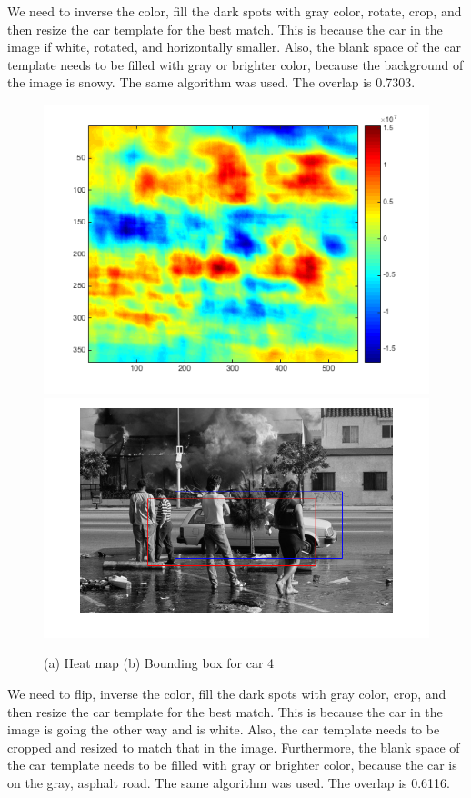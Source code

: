 \documentclass{assignment}
\begin{document}
\begin{problemlist}
\begin{enumerate}[label*=\arabic*.]
We need to inverse the color, fill the dark spots with gray color, rotate, crop, and then resize the car template for the best match. This is because the car in the image if white, rotated, and horizontally smaller. Also, the blank space of the car template needs to be filled with gray or brighter color, because the background of the image is snowy. The same algorithm was used. The overlap is 0.7303.\\

\begin{figure}[H]
\centering
\includegraphics[width=0.4\columnwidth]{4_3_4_1}
\includegraphics[width=0.4\columnwidth]{4_3_4_2} \\
\caption{(a) Heat map (b) Bounding box for car 4}
\label{fig:i4_3_4}
\end{figure}

We need to flip, inverse the color, fill the dark spots with gray color, crop, and then resize the car template for the best match. This is because the car in the image is going the other way and is white. Also, the car template needs to be cropped and resized to match that in the image. Furthermore, the blank space of the car template needs to be filled with gray or brighter color, because the car is on the gray, asphalt road. The same algorithm was used. The overlap is 0.6116.\\


\end{enumerate}
\end{problemlist}
\end{document}
